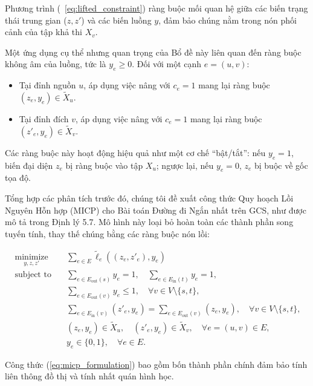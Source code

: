 Phương trình (~\ref{eq:lifted_constraint}) ràng buộc mối quan hệ giữa các biến trạng thái trung gian ($z, z'$) và các biến luồng $y$, đảm bảo chúng nằm trong nón phối cảnh của tập khả thi $X_v$.

Một ứng dụng cụ thể nhưng quan trọng của Bổ đề này liên quan đến ràng buộc không âm của luồng, tức là $y_e \ge 0$. Đối với một cạnh $e=(u, v)$:
\begin{itemize}
    \item Tại đỉnh nguồn $u$, áp dụng việc nâng với $c_e=1$ mang lại ràng buộc $(z_e, y_e) \in \tilde{X}_u$.
    \item Tại đỉnh đích $v$, áp dụng việc nâng với $c_e=1$ mang lại ràng buộc $(z'_e, y_e) \in \tilde{X}_v$.
\end{itemize}
Các ràng buộc này hoạt động hiệu quả như một cơ chế ``bật/tắt'': nếu $y_e=1$, biến đại diện $z_e$ bị ràng buộc vào tập $X_u$; ngược lại, nếu $y_e=0$, $z_e$ bị buộc về gốc tọa độ.


Tổng hợp các phân tích trước đó, chúng tôi đề xuất công thức Quy hoạch Lồi Nguyên Hỗn hợp (MICP) cho Bài toán Đường đi Ngắn nhất trên GCS, như được mô tả trong Định lý 5.7. Mô hình này loại bỏ hoàn toàn các thành phần song tuyến tính, thay thế chúng bằng các ràng buộc nón lồi:

\begin{subequations}~\label{eq:micp_formulation}
\begin{align}
  \underset{y, z, z'}{\text{minimize}} \quad & \sum_{e \in E} \tilde{\ell}_e((z_e, z'_e), y_e) \tag{5.5a} \\
  \text{subject to} \quad & \sum_{e \in E_{\text{out}}(s)} y_e = 1, \quad \sum_{e \in E_{\text{in}}(t)} y_e = 1, \tag{5.5b} \\
  & \sum_{e \in E_{\text{out}}(v)} y_e \le 1, \quad \forall v \in V \setminus \{s, t\}, \tag{5.5c} \\
  & \sum_{e \in E_{\text{in}}(v)} (z'_e, y_e) = \sum_{e \in E_{\text{out}}(v)} (z_e, y_e), \quad \forall v \in V \setminus \{s, t\}, \tag{5.5d} \\
  & (z_e, y_e) \in \tilde{X}_u, \quad (z'_e, y_e) \in \tilde{X}_v, \quad \forall e = (u, v) \in E, \tag{5.5e} \\
  & y_e \in \{0, 1\}, \quad \forall e \in E. \tag{5.5f}
\end{align}
\end{subequations}

Công thức (\ref{eq:micp_formulation}) bao gồm bốn thành phần chính đảm bảo tính liên thông đồ thị và tính nhất quán hình học.

